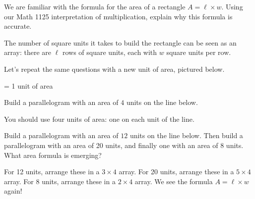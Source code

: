 \documentclass{ximera}
\begin{document}
\begin{problem}
 We are familiar with the formula for the area of a rectangle $A = \ell \times w$.  Using our Math 1125 interpretation of multiplication, explain why this formula is accurate.

\begin{solution}
    The number of square units it takes to build the rectangle can be seen as an array: there are $\ell$ rows of square units, each with $w$ square units per row.
\end{solution}

\end{problem}


Let's repeat the same questions with a new unit of area, pictured below.

  = 1 unit of area



\begin{problem}
Build a parallelogram with an area of $4$ units on the line below.

\vspace{2.5 cm}

\begin{solution}
 You should use four units of area: one on each unit of the line.
\end{solution}

\end{problem}

\begin{problem}
Build a parallelogram with an area of $12$ units on the line below.  Then build a parallelogram with an area of 20 units, and finally one with an area of 8 units.  What area formula is emerging?

\vspace{6.5cm}

\begin{solution}
    For 12 units, arrange these in a $3 \times 4$ array.  For 20 units, arrange these in a $5 \times 4$ array.  For 8 units, arrange these in a $2 \times 4$ array.  We see the formula $A = \ell \times w$ again!
\end{solution}

\end{problem}
\end{document}

